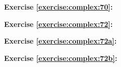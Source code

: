 \noindent\textbf{Exercise \ref{exercise:complex:70}:}

\noindent\textbf{Exercise \ref{exercise:complex:72}:}

\noindent\textbf{Exercise \ref{exercise:complex:72a}:}

\noindent\textbf{Exercise \ref{exercise:complex:72b}:}

%
%
%
%
%
%
%
%
%
%

